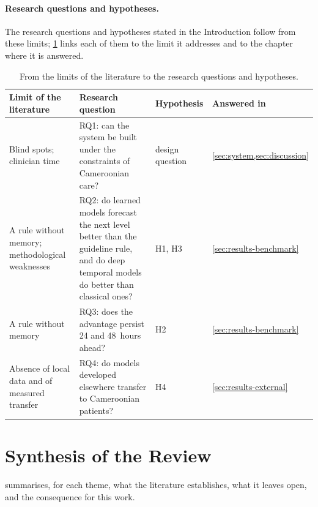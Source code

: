 \paragraph{Research questions and hypotheses.} The research questions and hypotheses stated in the Introduction follow from these limits; \cref{tab:gaps-rq} links each of them to the limit it addresses and to the chapter where it is answered.

\begin{table}[htbp]
\centering\footnotesize
\caption{From the limits of the literature to the research questions and hypotheses.}\label{tab:gaps-rq}
\begin{tabularx}{\textwidth}{@{}>{\raggedright\arraybackslash}p{3.6cm} >{\raggedright\arraybackslash}X >{\raggedright\arraybackslash}p{1.8cm} >{\raggedright\arraybackslash}p{2.3cm}@{}}
\toprule
\textbf{Limit of the literature} & \textbf{Research question} & \textbf{Hypothesis} & \textbf{Answered in} \\
\midrule
Blind spots; clinician time & RQ1: can the system be built under the constraints of Cameroonian care? & design question & \cref{sec:system,sec:discussion} \\
A rule without memory; methodological weaknesses & RQ2: do learned models forecast the next level better than the guideline rule, and do deep temporal models do better than classical ones? & H1, H3 & \cref{sec:results-benchmark} \\
A rule without memory & RQ3: does the advantage persist 24 and 48~hours ahead? & H2 & \cref{sec:results-benchmark} \\
Absence of local data and of measured transfer & RQ4: do models developed elsewhere transfer to Cameroonian patients? & H4 & \cref{sec:results-external} \\
\bottomrule
\end{tabularx}
\end{table}

\section{Synthesis of the Review}\label{sec:lr-synthesis}

 summarises, for each theme, what the literature establishes, what it leaves open, and the consequence for this work.

